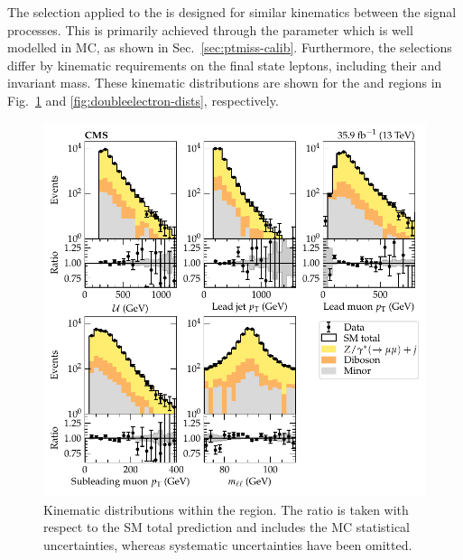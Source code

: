 The selection applied to the \diellplusjets is designed for similar kinematics
between the signal processes. This is primarily achieved through the \recoil
parameter which is well modelled in MC, as shown in
Sec.~\ref{sec:ptmiss-calib}. Furthermore, the selections differ by kinematic
requirements on the final state leptons, including their \pt and invariant
mass. These kinematic distributions are shown for the \dimuplusjets and
\dieleplusjets regions in Fig.~\ref{fig:doublemuon-dists} and
\ref{fig:doubleelectron-dists}, respectively.
%
\begin{figure}[htb]
    \centering
    \includegraphics{chapters/043_results/images/doublemuon_dists.pdf}
    \caption[Dimuon kinematics.]{
        Kinematic distributions within the \dimuplusjets region. The ratio is taken with respect to the SM total prediction and includes the MC statistical uncertainties, whereas systematic uncertainties have been omitted.
    }
    \label{fig:doublemuon-dists}
\end{figure}
%
